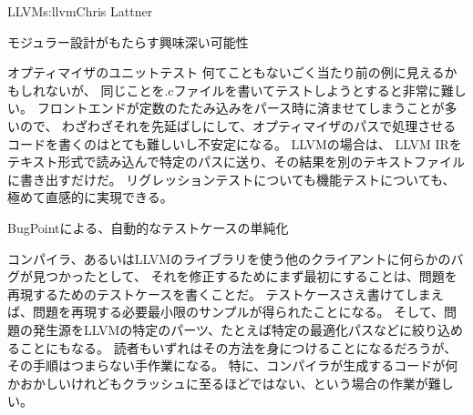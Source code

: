 \begin{aosachapter}{LLVM}{s:llvm}{Chris Lattner}
\begin{aosasect1}{モジュラー設計がもたらす興味深い可能性}
\begin{aosasect2}{オプティマイザのユニットテスト}
何てこともないごく当たり前の例に見えるかもしれないが、
同じことを.cファイルを書いてテストしようとすると非常に難しい。
フロントエンドが定数のたたみ込みをパース時に済ませてしまうことが多いので、
わざわざそれを先延ばしにして、オプティマイザのパスで処理させるコードを書くのはとても難しいし不安定になる。
LLVMの場合は、
LLVM IRをテキスト形式で読み込んで特定のパスに送り、その結果を別のテキストファイルに書き出すだけだ。
リグレッションテストについても機能テストについても、極めて直感的に実現できる。

\end{aosasect2}

\begin{aosasect2}{BugPointによる、自動的なテストケースの単純化}

コンパイラ、あるいはLLVMのライブラリを使う他のクライアントに何らかのバグが見つかったとして、
それを修正するためにまず最初にすることは、問題を再現するためのテストケースを書くことだ。
テストケースさえ書けてしまえば、問題を再現する必要最小限のサンプルが得られたことになる。
そして、問題の発生源をLLVMの特定のパーツ、たとえば特定の最適化パスなどに絞り込めることにもなる。
読者もいずれはその方法を身につけることになるだろうが、
その手順はつまらない手作業になる。
特に、コンパイラが生成するコードが何かおかしいけれどもクラッシュに至るほどではない、という場合の作業が難しい。


\end{aosasect2}
\end{aosasect1}
\end{aosachapter}
